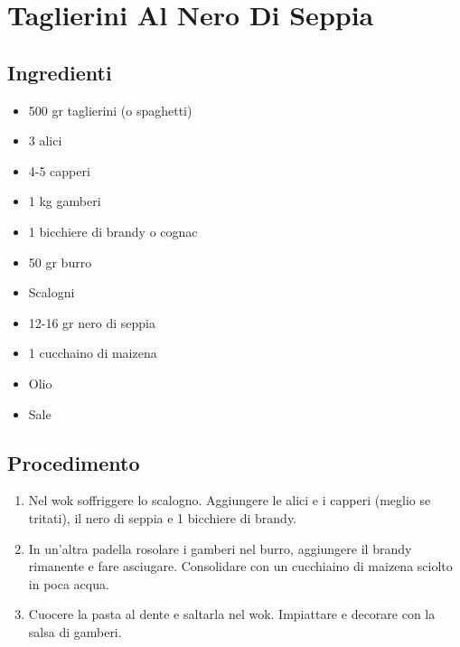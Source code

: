 \section{Taglierini Al Nero Di Seppia}
\subsection{Ingredienti}
\begin{itemize}
\item 500 gr taglierini (o spaghetti)  
\item 3 alici  
\item 4-5 capperi  
\item 1 kg gamberi  
\item 1 bicchiere di brandy o cognac  
\item 50 gr burro  
\item Scalogni  
\item 12-16 gr nero di seppia  
\item 1 cucchaino di maizena  
\item Olio  
\item Sale
\end{itemize}
\subsection{Procedimento}
\begin{enumerate}
\item  Nel wok soffriggere lo scalogno. Aggiungere le alici e i capperi (meglio se tritati), il nero di seppia e 1 bicchiere di brandy.  
\item  In un'altra padella rosolare i gamberi nel burro, aggiungere il brandy rimanente e fare asciugare. Consolidare con un cucchiaino di maizena sciolto in poca acqua.  
\item  Cuocere la pasta al dente e saltarla nel wok. Impiattare e decorare con la salsa di gamberi.
\end{enumerate}
